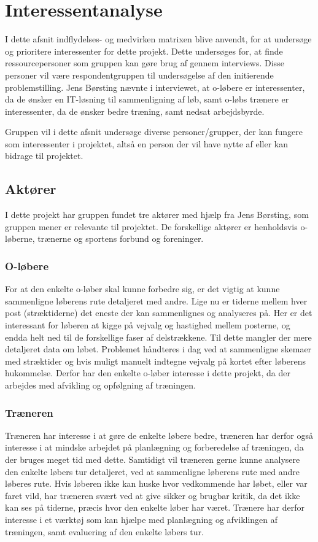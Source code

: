 \section{Interessentanalyse}
I dette afsnit indflydelses- og medvirken matrixen blive anvendt, for at undersøge og prioritere interessenter for dette projekt. Dette undersøges for, at finde ressourcepersoner som gruppen kan gøre brug af gennem interviews. Disse personer vil være respondentgruppen til undersøgelse af den initierende problemstilling.
Jens Børsting nævnte i interviewet, at o-løbere er interessenter, da de ønsker en IT-løsning til sammenligning af løb, samt o-løbs trænere er interessenter, da de ønsker bedre træning, samt nedsat arbejdsbyrde.

Gruppen vil i dette afsnit undersøge diverse personer/grupper, der kan fungere som interessenter i projektet, altså en person der vil have nytte af eller kan bidrage til projektet.

\subsection{Aktører}
I dette projekt har gruppen fundet tre aktører med hjælp fra Jens Børsting, som gruppen mener er relevante til projektet. De forskellige aktører er henholdsvis o-løberne, trænerne og sportens forbund og foreninger. 

\subsubsection{O-løbere}
For at den enkelte o-løber skal kunne forbedre sig, er det vigtig at kunne sammenligne løberens rute detaljeret med andre. Lige nu er tiderne mellem hver post (stræktiderne) det eneste der kan sammenlignes og analyseres på. Her er det interessant for løberen at kigge på vejvalg og hastighed mellem posterne, og endda helt ned til de forskellige faser af delstrækkene. Til dette mangler der mere detaljeret data om løbet. Problemet håndteres i dag ved at sammenligne skemaer med stræktider og hvis muligt manuelt indtegne vejvalg på kortet efter løberens hukommelse. Derfor har den enkelte o-løber interesse i dette projekt, da der arbejdes med afvikling og opfølgning af træningen. 

\subsubsection{Træneren}
Træneren har interesse i at gøre de enkelte løbere bedre, træneren har derfor også interesse i at mindske arbejdet på planlægning og forberedelse af træningen, da der bruges meget tid med dette. Samtidigt vil træneren gerne kunne analysere den enkelte løbers tur detaljeret, ved at sammenligne løberens rute med andre løberes rute. Hvis løberen ikke kan huske hvor vedkommende har løbet, eller var faret vild, har træneren svært ved at give sikker og brugbar kritik, da det ikke kan ses på tiderne, præcis hvor den enkelte løber har været. Trænere har derfor interesse i et værktøj som kan hjælpe med planlægning og afviklingen af træningen, samt evaluering af den enkelte løbers tur.

